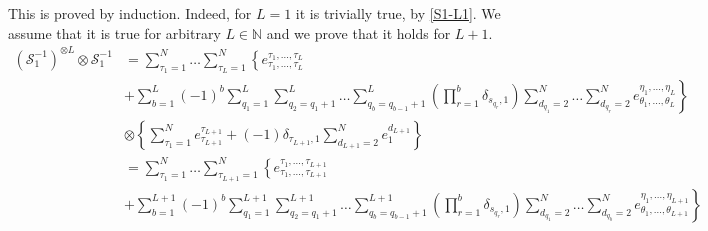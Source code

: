 \documentclass[11pt]{article}
\numberwithin{equation}{section}
\numberwithin{equation}{subsection}
\begin{document}
This is proved by induction. Indeed, for $L=1$ it is trivially true, by \eqref{S1-L1}. We assume that it is true for arbitrary $L\in \mathbb{N}$ and we prove that it holds for $L+1$. 
\begin{align*}
\left(\mathcal{S}_{1}^{-1}\right)^{\otimes L}\otimes \mathcal{S}_{1}^{-1}&=
\sum_{\tau_{1}=1}^{N}\ldots\sum_{\tau_{L}=1}^{N}\left\{e_{\tau_{1},\ldots,\tau_{L}}^{\tau_{1},\ldots,\tau_{L}}\right. \\&+\left. \sum_{b=1}^{L}(-1)^{b}\sum_{q_{1}=1}^{L}\sum_{q_{2}=q_{1}+1}^{L}\ldots\sum_{q_{b}=q_{b-1}+1}^{L}\left(\prod_{r=1}^{b}\delta_{s_{q_{r}},1}\right)\sum_{d_{q_{1}}=2}^{N}\ldots\sum_{d_{q_{r}}=2}^{N}e_{\theta_{1},\ldots,\theta_{L}}^{\eta_{1},\ldots,\eta_{L}}\right\}
\\&\otimes
\left\{ \sum_{\tau_{1}=1}^{N}e_{\tau_{L+1}}^{\tau_{L+1}}+(-1)\delta_{\tau_{L+1},1}\sum_{d_{L+1}=2}^{N}e_{1}^{d_{L+1}}\right\}
\\&=
	\sum_{\tau_{1}=1}^{N}\ldots\sum_{\tau_{L+1}=1}^{N}\left\{e_{\tau_{1},\ldots,\tau_{L+1}}^{\tau_{1},\ldots,\tau_{L+1}}\right. \\&+\left. \sum_{b=1}^{L+1}(-1)^{b}\sum_{q_{1}=1}^{L+1}\sum_{q_{2}=q_{1}+1}^{L+1}\ldots\sum_{q_{b}=q_{b-1}+1}^{L+1}\left(\prod_{r=1}^{b}\delta_{s_{q_{r}},1}\right)\sum_{d_{q_{1}}=2}^{N}\ldots\sum_{d_{q_{b}}=2}^{N}e_{\theta_{1},\ldots,\theta_{L+1}}^{\eta_{1},\ldots,\eta_{L+1}}\right\}
\end{align*}
\end{document}
